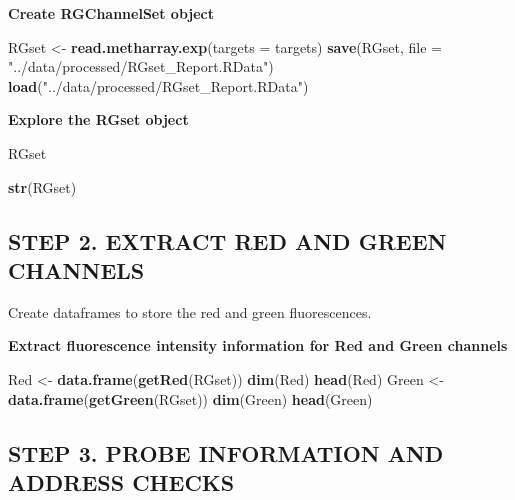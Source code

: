 \documentclass[
  11pt,
]{article}
\newenvironment{Shaded}{\begin{snugshade}}{\end{snugshade}}
\newcommand{\AttributeTok}[1]{\textcolor[rgb]{0.13,0.29,0.53}{#1}}
\newcommand{\FunctionTok}[1]{\textcolor[rgb]{0.13,0.29,0.53}{\textbf{#1}}}
\newcommand{\NormalTok}[1]{#1}
\newcommand{\OtherTok}[1]{\textcolor[rgb]{0.56,0.35,0.01}{#1}}
\newcommand{\StringTok}[1]{\textcolor[rgb]{0.31,0.60,0.02}{#1}}
\begin{document}
\textbf{Create RGChannelSet object}

\begin{Shaded}
\begin{Highlighting}[]
\NormalTok{RGset }\OtherTok{\textless{}{-}} \FunctionTok{read.metharray.exp}\NormalTok{(}\AttributeTok{targets =}\NormalTok{ targets)}
\FunctionTok{save}\NormalTok{(RGset, }\AttributeTok{file =} \StringTok{"../data/processed/RGset\_Report.RData"}\NormalTok{)}
\FunctionTok{load}\NormalTok{(}\StringTok{"../data/processed/RGset\_Report.RData"}\NormalTok{)}
\end{Highlighting}
\end{Shaded}

\textbf{Explore the RGset object}

\begin{Shaded}
\begin{Highlighting}[]
\NormalTok{RGset}
\end{Highlighting}
\end{Shaded}

\begin{Shaded}
\begin{Highlighting}[]
\FunctionTok{str}\NormalTok{(RGset)}
\end{Highlighting}
\end{Shaded}

\subsection{STEP 2. EXTRACT RED AND GREEN
CHANNELS}\label{step-2.-extract-red-and-green-channels}

Create dataframes to store the red and green fluorescences.

\textbf{Extract fluorescence intensity information for Red and Green
channels}

\begin{Shaded}
\begin{Highlighting}[]
\NormalTok{Red }\OtherTok{\textless{}{-}} \FunctionTok{data.frame}\NormalTok{(}\FunctionTok{getRed}\NormalTok{(RGset))}
\FunctionTok{dim}\NormalTok{(Red)}
\FunctionTok{head}\NormalTok{(Red)}
\NormalTok{Green }\OtherTok{\textless{}{-}} \FunctionTok{data.frame}\NormalTok{(}\FunctionTok{getGreen}\NormalTok{(RGset))}
\FunctionTok{dim}\NormalTok{(Green)}
\FunctionTok{head}\NormalTok{(Green)}
\end{Highlighting}
\end{Shaded}

\subsection{STEP 3. PROBE INFORMATION AND ADDRESS
CHECKS}\label{step-3.-probe-information-and-address-checks}
\end{document}
